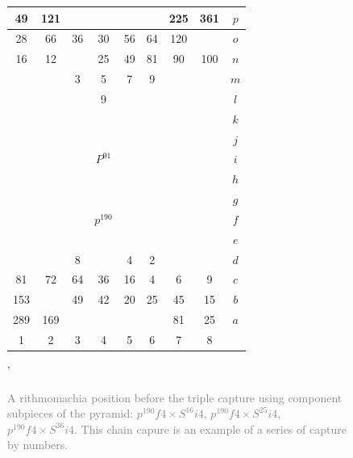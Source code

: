 \documentclass[14pt]{extarticle}
\begin{document}
\begin{figure}[H] 
\centering 
{\small{
\begin{tabular}{|c|c|c|c|c|c|c|c||c} \hline
\squadfill{\,}49 & \squadfill{\,}121 & \quad  & \quad  & \quad  & \quad  & \squadfill{\,}225 & \squadfill{\,}361 & $p$ \\ \hline
\squadfill{\,}28 & \squadfill{\,}66 & \trianglepafill{\,}36 & \trianglepafill{\,}30 & \trianglepafill{\,}56 & \trianglepafill{\,}64 & \squadfill{\,}120 & \quad  & $o$ \\ \hline
\trianglepafill{\,}16 & \trianglepafill{\,}12 & \quad  & \circletfill{\,}25 & \circletfill{\,}49 & \circletfill{\,}81 & \trianglepafill{\,}90 & \trianglepafill{\,}100 & $n$ \\ \hline
\quad  & \quad  & \circletfill{\,}3 & \circletfill{\,}5 & \circletfill{\,}7 & \circletfill{\,}9 & \quad  & \quad  & $m$ \\ \hline
\quad  & \quad  & \quad  & \circletfill{\,}9 & \quad  & \quad  & \quad  & \quad  & $l$ \\ \hline
\quad  & \quad  & \quad  & \quad  & \quad  & \quad  & \quad  & \quad  & $k$ \\ \hline
\quad  & \quad  & \quad  & \quad  & \quad  & \quad  & \quad  & \quad  & $j$ \\ \hline
\quad  & \quad  & \quad  & \rhombus{\,}$P^{91}$ & \quad  & \quad  & \quad  & \quad  & $i$ \\ \hline
\quad  & \quad  & \quad  & \quad  & \quad  & \quad  & \quad  & \quad  & $h$ \\ \hline
\quad  & \quad  & \quad  & \quad  & \quad  & \quad  & \quad  & \quad  & $g$ \\ \hline
\quad  & \quad  & \quad  & \rhombusfill{\,}$p^{190}$ & \quad  & \quad  & \quad  & \quad  & $f$ \\ \hline
\quad  & \quad  & \quad  & \quad  & \quad  & \quad  & \quad  & \quad  & $e$ \\ \hline
\quad  & \quad  & \circlet{\,}8 & \quad  & \circlet{\,}4 & \circlet{\,}2 & \quad  & \quad  & $d$ \\ \hline
\trianglepa{\,}81 & \trianglepa{\,}72 & \circlet{\,}64 & \circlet{\,}36 & \circlet{\,}16 & \circlet{\,}4 & \trianglepa{\,}6 & \trianglepa{\,}9 & $c$ \\ \hline
\squad{\,}153 & \quad  & \trianglepa{\,}49 & \trianglepa{\,}42 & \trianglepa{\,}20 & \trianglepa{\,}25 & \squad{\,}45 & \squad{\,}15 & $b$ \\ \hline
\squad{\,}289 & \squad{\,}169 & \quad  & \quad  & \quad  & \quad  & \squad{\,}81 & \squad{\,}25 & $a$ \\ \hline
1 &  2 &  3 &  4 &  5 &  6 &  7 &  8  &  \\
\end{tabular} '
}}
\caption{\textcolor{gray}{A rithmomachia position before the triple capture using component
    subpieces of the pyramid: $p^{190}f4\times S^{16}i4$, $p^{190}f4\times S^{25}i4$, $p^{190}f4\times S^{36}i4$.
    This chain capure is an example of a series of capture by numbers.}}
\label{fig:rithmomachia-capture-C36-with-pyramid2} 
\end{figure}
\end{document}
